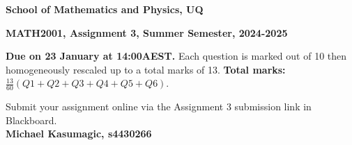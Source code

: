 \documentclass[a4paper,12pt]{report}
\begin{document}
\begin{center}
{\bf School of Mathematics and Physics, UQ}
\end{center}
\centerline{\large\bf MATH2001, Assignment 3, Summer Semester, 2024-2025}

\vspace{3mm}

{\bf Due on 23 January at 14:00AEST.} Each question is marked out of 10 then homogeneously rescaled up to a total marks of 13. {\bf Total marks: $\frac{13}{60}(Q1+Q2+Q3+Q4+Q5+Q6) $}. 

Submit your assignment online via the Assignment 3 submission link in Blackboard. \\
\textbf{Michael Kasumagic, s4430266}

\sol
\end{document}
